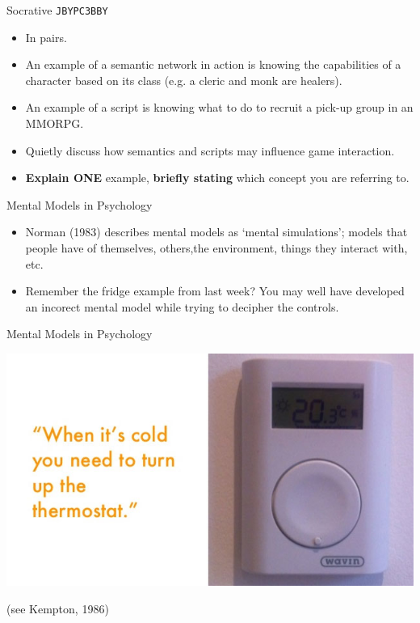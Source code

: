 \begin{frame}[fragile]{Socrative \texttt{JBYPC3BBY}}
	\begin{itemize}
		\item In pairs.
		\item An example of a semantic network in action is knowing the capabilities of a character based on its class (e.g. a cleric and monk are healers).
		\item An example of a script is knowing what to do to recruit a pick-up group in an MMORPG.
		\item Quietly discuss how semantics and scripts may influence game interaction.
		\item \textbf{Explain ONE} example, \textbf{briefly stating} which concept you are referring to.
	\end{itemize}
\end{frame}

\begin{frame}{Mental Models in Psychology}
	\begin{itemize}
		\item Norman (1983) describes mental models as `mental simulations'; models that people have of themselves, others,the environment, things they interact with, etc.
		\item Remember the fridge example from last week? You may well have developed an incorect mental model while trying to decipher the controls.
	\end{itemize}
\end{frame}

\begin{frame}{Mental Models in Psychology}
	\begin{centering}
		\includegraphics[height=26ex]{thermostat_invalid_model.jpg}
	\end{centering}
	
	\vspace{2ex}
	
	(see Kempton, 1986)
\end{frame}


